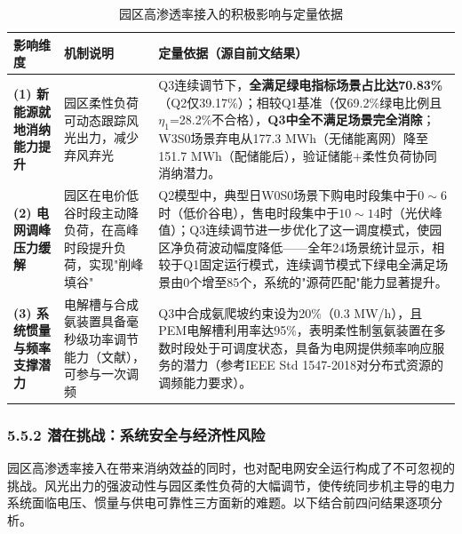 \documentclass[zihao=-4,a4paper]{ctexart} %
\begin{document}
	\begin{table}[ht]
		\centering
		\small
		\caption{园区高渗透率接入的积极影响与定量依据}
		\label{tab:q5_positive}
		\begin{tabular}{p{28mm}p{48mm}p{60mm}}
			\toprule
			影响维度 & 机制说明 & 定量依据（源自前文结果） \\
			\midrule
			\textbf{(1) 新能源就地消纳能力提升} & 园区柔性负荷可动态跟踪风光出力，减少弃风弃光 & Q3连续调节下，\textbf{全满足绿电指标场景占比达70.83\%}（Q2仅39.17\%）；相较Q1基准（仅69.2\%绿电比例且$\eta_1$=28.2\%不合格），\textbf{Q3中全不满足场景完全消除}；W3S0场景弃电从177.3 MWh（无储能离网）降至151.7 MWh（配储能后），验证储能$+$柔性负荷协同消纳潜力。 \\
			\midrule
			\textbf{(2) 电网调峰压力缓解} & 园区在电价低谷时段主动降负荷，在高峰时段提升负荷，实现"削峰填谷" & Q2模型中，典型日W0S0场景下购电时段集中于$0\sim6$时（低价谷电），售电时段集中于$10\sim14$时（光伏峰值）；Q3连续调节进一步优化了这一调度模式，使园区净负荷波动幅度降低——全年24场景统计显示，相较于Q1固定运行模式，连续调节模式下绿电全满足场景由0个增至85个，系统的"源荷匹配"能力显著提升。 \\
			\midrule
			\textbf{(3) 系统惯量与频率支撑潜力} & 电解槽与合成氨装置具备毫秒级功率调节能力（文献\cite{1}），可参与一次调频 & Q3中合成氨爬坡约束设为20\%（0.3 MW/h），且PEM电解槽利用率达95\%，表明柔性制氢氨装置在多数时段处于可调度状态，具备为电网提供频率响应服务的潜力（参考IEEE Std 1547-2018对分布式资源的调频能力要求）。 \\
			\bottomrule
		\end{tabular}
	\end{table}
	
	\subsubsection*{5.5.2 潜在挑战：系统安全与经济性风险}
	
	园区高渗透率接入在带来消纳效益的同时，也对配电网安全运行构成了不可忽视的挑战。风光出力的强波动性与园区柔性负荷的大幅调节，使传统同步机主导的电力系统面临电压、惯量与供电可靠性三方面新的难题。以下结合前四问结果逐项分析。
	
\end{document}
